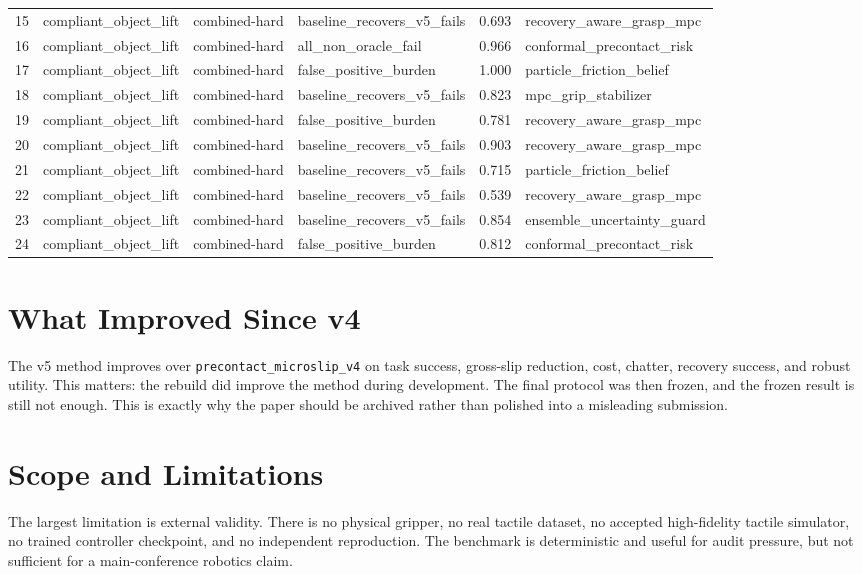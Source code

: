 \documentclass{article}
\begin{document}
\begin{longtable}{@{}rlllrl@{}}
15 & compliant\_object\_lift & combined-hard & baseline\_recovers\_v5\_fails & 0.693 & recovery\_aware\_grasp\_mpc \\
16 & compliant\_object\_lift & combined-hard & all\_non\_oracle\_fail & 0.966 & conformal\_precontact\_risk \\
17 & compliant\_object\_lift & combined-hard & false\_positive\_burden & 1.000 & particle\_friction\_belief \\
18 & compliant\_object\_lift & combined-hard & baseline\_recovers\_v5\_fails & 0.823 & mpc\_grip\_stabilizer \\
19 & compliant\_object\_lift & combined-hard & false\_positive\_burden & 0.781 & recovery\_aware\_grasp\_mpc \\
20 & compliant\_object\_lift & combined-hard & baseline\_recovers\_v5\_fails & 0.903 & recovery\_aware\_grasp\_mpc \\
21 & compliant\_object\_lift & combined-hard & baseline\_recovers\_v5\_fails & 0.715 & particle\_friction\_belief \\
22 & compliant\_object\_lift & combined-hard & baseline\_recovers\_v5\_fails & 0.539 & recovery\_aware\_grasp\_mpc \\
23 & compliant\_object\_lift & combined-hard & baseline\_recovers\_v5\_fails & 0.854 & ensemble\_uncertainty\_guard \\
24 & compliant\_object\_lift & combined-hard & false\_positive\_burden & 0.812 & conformal\_precontact\_risk \\
\bottomrule
\end{longtable}


\section{What Improved Since v4}
The v5 method improves over \texttt{precontact\_microslip\_v4} on task success, gross-slip reduction, cost, chatter, recovery success, and robust utility. This matters: the rebuild did improve the method during development. The final protocol was then frozen, and the frozen result is still not enough. This is exactly why the paper should be archived rather than polished into a misleading submission.

\section{Scope and Limitations}
The largest limitation is external validity. There is no physical gripper, no real tactile dataset, no accepted high-fidelity tactile simulator, no trained controller checkpoint, and no independent reproduction. The benchmark is deterministic and useful for audit pressure, but not sufficient for a main-conference robotics claim.
\end{document}
